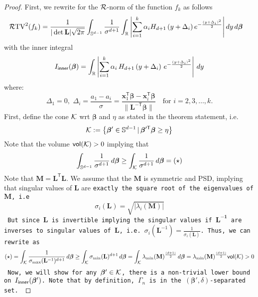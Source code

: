 \begin{proof}
    First, we rewrite  for the ${\mathcal{R}}$-norm of the function $f_k$ as follows
    \begin{align*}
        \mathcal{R}\mathrm{TV}^2({f_k}) &= \frac{1}{|\det \mathbf{L}| \sqrt{2\pi}} \int_{\mathbb{S}^{d-1}} \frac{1}{\sigma^{d+1}} \int_{\mathbb{R}} \left| \sum_{i=1}^k \alpha_i H_{d+1}\left( y + \Delta_i \right) e^{ -\frac{(y + \Delta_i)^2}{2} } \right| dy \, d\bm{\beta} 
    \end{align*}
    with the inner integral \vspace{-2mm}
    \[I_{\textsf{inner}}(\bm{\beta}) = \int_{\mathbb{R}} \left| \sum_{i=1}^k \alpha_i \, H_{d+1}\left( y + \Delta_i \right) \, e^{ -\frac{(y + \Delta_i)^2}{2} } \right| \, dy
\]
where:
\[
\Delta_1 = 0,\,\,\Delta_i = \frac{a_1 - a_i}{\sigma} = \frac{\bm{x}_1^\mathsf{T}\bm{\beta} - \bm{x}_i^\mathsf{T}\bm{\beta}}{\|\mathbf{L}^{-\mathsf{T}}\bm{\beta}\|}
\quad \text{for } i = 2, 3, \ldots, k.
\]
First, define the cone ${\mathcal{K}}$ wrt $\bm{\beta}$ and $\eta$ as stated in the theorem statement, i.e.
\begin{align*}
    {\mathcal{K}} := \left\{\bm{\beta}' \in \mathbb{S}^{d-1}\,|\, \bm{\beta}'^{\mathsf{T}} \bm{\beta} \ge \eta\right\}
\end{align*}
Note that the volume $\textsf{vol}({{\mathcal{K}}}) > 0$ implying that 
\begin{align}
    \int_{\mathbb{S}^{d-1}} \frac{1}{\sigma^{d+1}} \, d\bm{\bm{\beta}} \ge  \int_{{\mathcal{K}}} \frac{1}{\sigma^{d+1}} \, d\bm{\beta} = (\star) \label{eq: cone}
\end{align}
    Note that $\mathbf{M} = \mathbf{L}^\mathsf{T}\mathbf{L}$. We assume that the $\mathbf{M}$ is symmetric and PSD, implying that singular values of $\mathbf{L}$ are \tt{exactly} the square root of the eigenvalues of $\mathbf{M}$, i.e
    \[ \sigma_i(\mathbf{L}) = \sqrt{|\lambda_i(\mathbf{M})|}\]
     But since $\mathbf{L}$ is invertible implying the singular values if $\mathbf{L^{-1}}$ are inverses to singular values of $\mathbf{L}$, i.e. $\sigma_i(\mathbf{L}^{-1}) = \frac{1}{\sigma_i(\mathbf{L})}$.
    Thus, we can rewrite  as
    \begin{align}
     (\star) =  \int_{{\mathcal{K}}} \frac{1}{\sigma_{\max}(\mathbf{L}^{-1})^{d+1}} \, d\bm{\beta} \ge \int_{{\mathcal{K}}} \sigma_{\min}(\mathbf{L})^{d+1} \, d\bm{\beta} = \int_{{\mathcal{K}}} \lambda_{\min}(\mathbf{M})^{\frac{(d+1)}{2}} \, d\bm{\beta} =  \lambda_{\min}(\mathbf{M})^{\frac{(d+1)}{2}} \textsf{vol}({{\mathcal{K}}}) > 0 \label{eq: vol}
    \end{align}
    Now, we will show for any $\bm{\beta}' \in {\mathcal{K}}$, there is a non-trivial lower bound on $I_{\textsf{inner}}(\bm{\beta}')$. Note that by definition, $\Gamma_n$ is in the $(\bm{\beta}',\delta)$-separated set. 


\end{proof}

